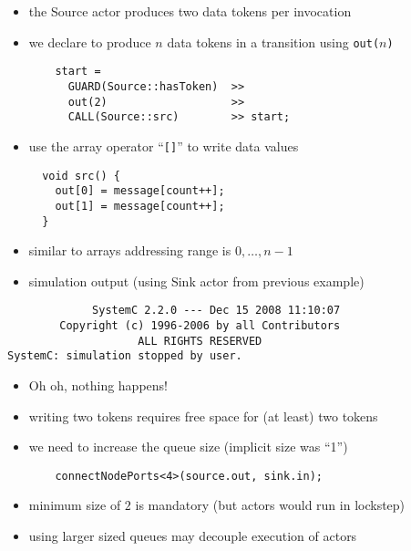 \begin{frame}[fragile=singleslide]
\begin{itemize}
\item the Source actor produces two data tokens per invocation
\item we declare to produce $n$ data tokens in a transition  using \lstinline!out(!$n$\lstinline!)!
\begin{lstlisting}
    start = 
      GUARD(Source::hasToken)  >>
      out(2)                   >>
      CALL(Source::src)        >> start;
\end{lstlisting}
\item use the array operator ``\lstinline![]!'' to write data values
\begin{lstlisting}
  void src() {
    out[0] = message[count++];
    out[1] = message[count++];
  }
\end{lstlisting}
\item similar to arrays addressing range is $0, \dots, n-1$
\end{itemize}
\end{frame}





\begin{frame}[fragile=singleslide]
\begin{itemize}
\item simulation output (using Sink actor from previous example)
\end{itemize}
\begin{lstlisting}
             SystemC 2.2.0 --- Dec 15 2008 11:10:07
        Copyright (c) 1996-2006 by all Contributors
                    ALL RIGHTS RESERVED
SystemC: simulation stopped by user.
\end{lstlisting}
\begin{itemize}
\item Oh oh, nothing happens!
\item writing two tokens requires free space for (at least) two tokens
\item we need to increase the queue size (implicit size was ``1'')
\begin{lstlisting}
    connectNodePorts<4>(source.out, sink.in);
\end{lstlisting}
\item minimum size of $2$ is mandatory (but actors would run in lockstep)
\item using larger sized queues may decouple execution of actors
\end{itemize}
\end{frame}






